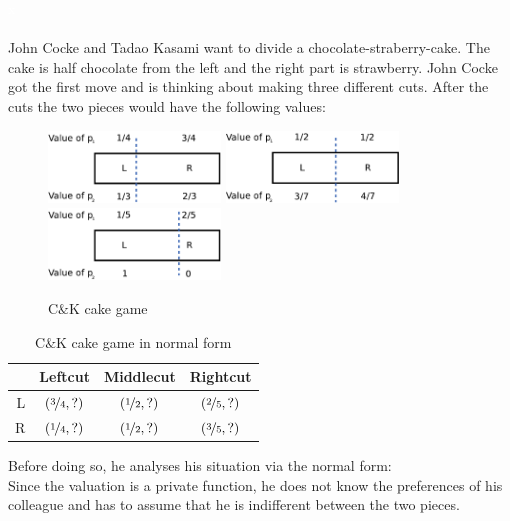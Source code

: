 \begin{bsp}
\label{bsp1}
\textcolor{white}{x}\\\\
John Cocke and Tadao Kasami want to divide a chocolate-straberry-cake. The cake is half chocolate from the left and the right part is strawberry. John Cocke got the first move and is thinking about making three different cuts. After the cuts the two pieces would have the following values:
	\begin{figure}[!h]
		\centering
 		 \includegraphics[width=130pt]{bilder/ex1.pdf}
 		 \includegraphics[width=130pt]{bilder/ex2.pdf}
 		 \includegraphics[width=130pt]{bilder/ex3.pdf}
   \caption{C$\&$K cake game}
  	 \end{figure}
  	 \newline
\begin{table}[htb]
\centering
 \renewcommand{\arraystretch}{1.2} 
\begin{tabular}{c|c|c|c|}
\cline{2-4}
&\multicolumn{1}{|c|}{{Leftcut}}& {Middlecut}&{Rightcut}\\
\hline
\multicolumn{1}{|r|}{{L}}&$\left(\nicefrac{3}{4}, ?\right)$&$\left(\nicefrac{1}{2}, ?\right)$&$\left(\nicefrac{2}{5}, ?\right)$\\
\hline
\multicolumn{1}{|r|}{{R}}&$\left(\nicefrac{1}{4}, ?\right)$&$\left(\nicefrac{1}{2}, ?\right)$&$\left(\nicefrac{3}{5}, ?\right)$\\
\hline
\end{tabular}
\caption{C$\&$K cake game in normal form}\label{Table1}
\end{table}
Before doing so, he analyses his situation via the normal form:\\Since the valuation is a private function, he does not know the preferences of his colleague and has to assume that he is indifferent between the two pieces. %

\end{bsp}
